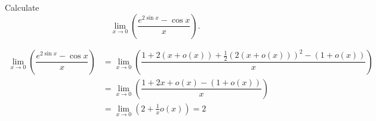 \begin{example}
    Calculate \[\lim_{x\to0}\left(\dfrac{e^{2\sin{x}}-\cos{x}}{x}\right).\]
    
    \begin{align*}
        \lim_{x\to0}\left(\dfrac{e^{2\sin{x}}-\cos{x}}{x}\right)&=\lim_{x\to0}\left(\dfrac{1+2(x+o(x))+\frac12(2(x+o(x)))^2-(1+o(x))}{x}\right)\\
        &=\lim_{x\to0}\left(\dfrac{1+2x+o(x)-(1+o(x))}{x}\right)\\
        &=\lim_{x\to0}\left(2+\frac1xo(x)\right)=2
    \end{align*}
\end{example}
